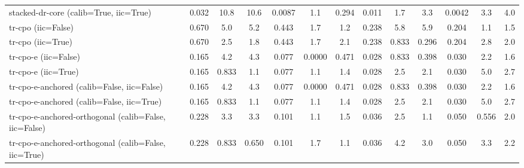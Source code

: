 \begin{table}[htbp]
\begin{tabular}{l|cccccccccccc}
stacked-dr-core (calib=True, iic=True) & 0.032 & 10.8 & 10.6 & 0.0087 & 1.1 & 0.294 & 0.011 & 1.7 & 3.3 & 0.0042 & 3.3 & 4.0 \\
tr-cpo (iic=False) & 0.670 & 5.0 & 5.2 & 0.443 & 1.7 & 1.2 & 0.238 & 5.8 & 5.9 & 0.204 & 1.1 & 1.5 \\
tr-cpo (iic=True) & 0.670 & 2.5 & 1.8 & 0.443 & 1.7 & 2.1 & 0.238 & 0.833 & 0.296 & 0.204 & 2.8 & 2.0 \\
tr-cpo-e (iic=False) & 0.165 & 4.2 & 4.3 & 0.077 & 0.0000 & 0.471 & 0.028 & 0.833 & 0.398 & 0.030 & 2.2 & 1.6 \\
tr-cpo-e (iic=True) & 0.165 & 0.833 & 1.1 & 0.077 & 1.1 & 1.4 & 0.028 & 2.5 & 2.1 & 0.030 & 5.0 & 2.7 \\
tr-cpo-e-anchored (calib=False, iic=False) & 0.165 & 4.2 & 4.3 & 0.077 & 0.0000 & 0.471 & 0.028 & 0.833 & 0.398 & 0.030 & 2.2 & 1.6 \\
tr-cpo-e-anchored (calib=False, iic=True) & 0.165 & 0.833 & 1.1 & 0.077 & 1.1 & 1.4 & 0.028 & 2.5 & 2.1 & 0.030 & 5.0 & 2.7 \\
tr-cpo-e-anchored-orthogonal (calib=False, iic=False) & 0.228 & 3.3 & 3.3 & 0.101 & 1.1 & 1.5 & 0.036 & 2.5 & 1.1 & 0.050 & 0.556 & 2.0 \\
tr-cpo-e-anchored-orthogonal (calib=False, iic=True) & 0.228 & 0.833 & 0.650 & 0.101 & 1.7 & 1.1 & 0.036 & 4.2 & 3.0 & 0.050 & 3.3 & 2.2 \\
\bottomrule
\end{tabular}
\end{table}